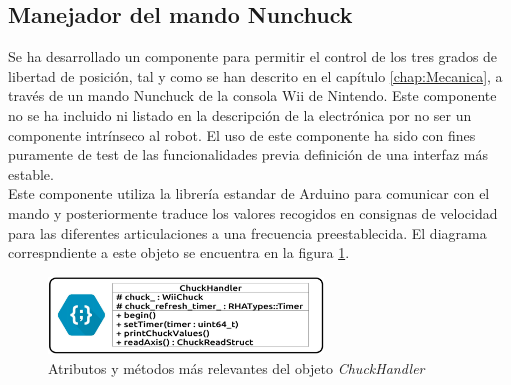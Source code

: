     \subsection{Manejador del mando Nunchuck} \label{subsec:SW:chuck_handler}
        Se ha desarrollado un componente para permitir el control de los tres grados de libertad de posición, tal y como se han descrito en el capítulo \ref{chap:Mecanica}, a través de un mando Nunchuck de la consola Wii de Nintendo. Este componente no se ha incluido ni listado en la descripción de la electrónica por no ser un componente intrínseco al robot. El uso de este componente ha sido con fines puramente de test de las funcionalidades previa definición de una interfaz más estable.
        \\
        Este componente utiliza la librería  estandar de Arduino para comunicar con el mando y posteriormente traduce los valores recogidos en consignas de velocidad para las diferentes articulaciones a una frecuencia preestablecida. El diagrama correspndiente a este objeto se encuentra en la figura \ref{fig:SW:class_diagram_CHH}.

        \begin{figure}[H]
          	\centering
          	\includegraphics[width=0.65\textwidth]{figuras/Imagenes_SW/class_diagram_CHH.jpg}
          	\caption{Atributos y métodos más relevantes del objeto \textit{ChuckHandler}}
          	\label{fig:SW:class_diagram_CHH}
        \end{figure}


